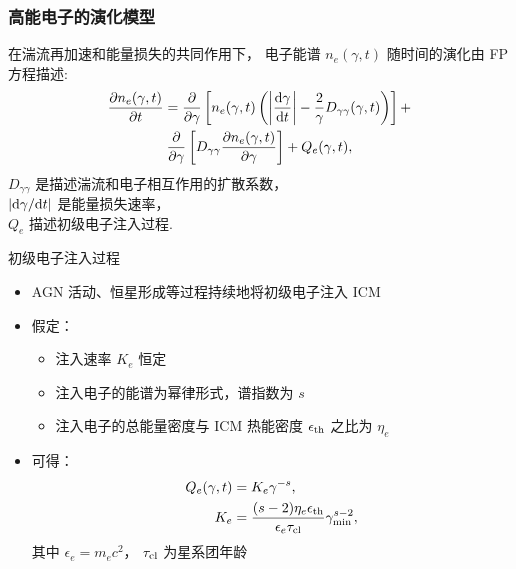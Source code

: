 \documentclass{beamer}
\begin{document}
\begin{frame}[subsec]
  \frametitle{高能电子的演化模型}
  在\alert{湍流再加速}和\alert{能量损失}的共同作用下，
  电子能谱 $n_e(\gamma, t)$ 随时间的演化由 \alert{FP 方程}描述:
  \begin{multline}
    \frac{\partial n_e(\gamma, t)}{\partial t} =
      \frac{\partial }{\partial \gamma} \left[ n_e(\gamma, t) \left(
        \left| \frac{\text{d}\gamma}{\text{d}t} \right| -
        \frac{2}{\gamma} D_{\gamma\gamma}(\gamma, t) \right) \right] + \\
      \frac{\partial }{\partial \gamma} \left[
      D_{\gamma\gamma} \frac{\partial n_e(\gamma, t)}{\partial \gamma} \right]
      + Q_e(\gamma, t) ,
  \end{multline}
  $D_{\gamma\gamma}$ 是描述湍流和电子相互作用的扩散系数，\\
  $|\text{d}\gamma / \text{d}t|$ 是能量损失速率，\\
  $Q_e$ 描述初级电子注入过程.
\end{frame}

\begin{frame}[t]
  \begin{alertblock}{初级电子注入过程}
    \smallskip
    \begin{itemize}
      \item AGN 活动、恒星形成等过程持续地将初级电子注入 ICM
      \item 假定：
        \begin{itemize}
          \item 注入速率 $K_e$ 恒定
          \item 注入电子的能谱为幂律形式，谱指数为 $s$
          \item 注入电子的总能量密度与 ICM 热能密度 $\epsilon_{\text{th}}$
            之比为 $\eta_e$
        \end{itemize}
      \item 可得：
        \begin{align}
          Q_e(\gamma, t) & = K_e \gamma^{-s} , \\
          K_e & = \frac{(s-2) \eta_e \epsilon_{\text{th}}}{
            \epsilon_e \tau_{\text{cl}}} \gamma_{\text{min}}^{s-2} ,
        \end{align}
        其中 $\epsilon_e = m_e c^2$，
        $\tau_{\text{cl}}$ 为星系团年龄
    \end{itemize}
  \end{alertblock}
\end{frame}
\end{document}

